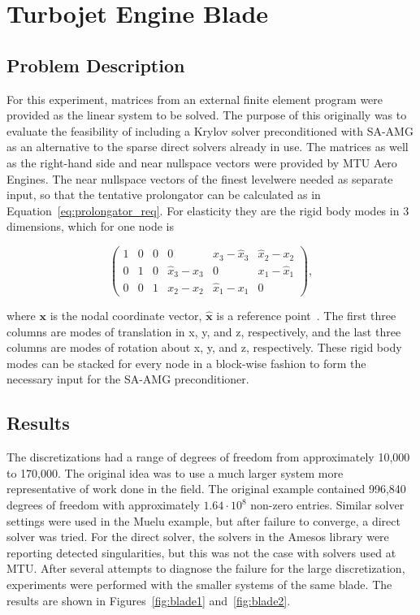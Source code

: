 \section{Turbojet Engine Blade}
\subsection{Problem Description}
For this experiment, matrices from an external finite element program were provided as the linear system to be solved. The purpose of this originally was to evaluate the feasibility of including a Krylov solver preconditioned with SA-AMG as an alternative to the sparse direct solvers already in use. The matrices as well as the right-hand side and near nullspace vectors were provided by MTU Aero Engines. The near nullspace vectors of the finest levelwere needed as separate input, so that the tentative prolongator can be calculated as in Equation~\ref{eq:prolongator_req}. For elasticity they are the rigid body modes in 3 dimensions, which for one node is

\begin{equation}
    \begin{pmatrix}
        1 & 0 & 0 & 0 & x_3 - \hat{x}_3 & \hat{x}_2 - x_2 \\
        0 & 1 & 0 & \hat{x}_3 - x_3 & 0 & x_1 - \hat{x}_1 \\
        0 & 0 & 1 & x_2 - \hat{x}_2 & \hat{x}_1 - x_1 & 0
    \end{pmatrix},
\end{equation}

where $\mathbf{x}$ is the nodal coordinate vector, $\mathbf{\hat{x}}$ is a reference point~\cite{Gee2006}. The first three columns are modes of translation in x, y, and z, respectively, and the last three columns are modes of rotation about x, y, and z, respectively. These rigid body modes can be stacked for every node in a block-wise fashion to form the necessary input for the SA-AMG preconditioner.

\subsection{Results}
The discretizations had a range of degrees of freedom from approximately 10,000 to 170,000. The original idea was to use a much larger system more representative of work done in the field. The original example contained 996,840 degrees of freedom with approximately $1.64 \cdot 10^8$ non-zero entries. Similar solver settings were used in the Muelu example, but after failure to converge, a direct solver was tried. For the direct solver, the solvers in the Amesos library were reporting detected singularities, but this was not the case with solvers used at MTU. After several attempts to diagnose the failure for the large discretization, experiments were performed with the smaller systems of the same blade. The results are shown in Figures~\ref{fig:blade1} and~\ref{fig:blade2}.

